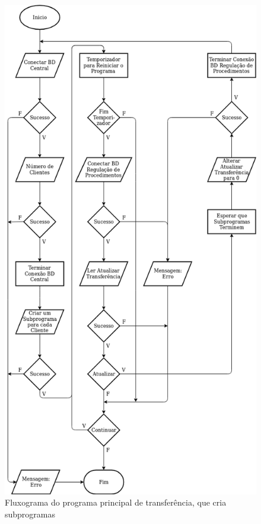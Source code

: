 \documentclass[11pt,twoside,a4paper]{report}
\begin{document}
\begin{figure}
	\vspace{0cm}
	\begin{center}
		\includegraphics[width=.7\textwidth]{fluxograma_transferencia_programa4} %
		\caption[Fluxograma do programa principal de transferência]{Fluxograma do programa principal de transferência, que cria subprogramas}
		\label{fig:transferencia_programa}
	\end{center}
\end{figure}
\end{document}
